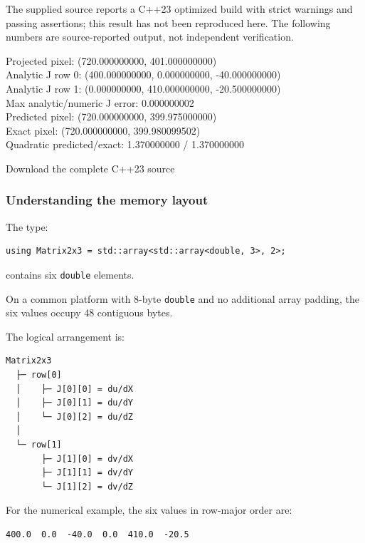The supplied source reports a C++23 optimized build with strict warnings and passing assertions; this result has not been reproduced here. The following numbers are source-reported output, not independent verification.

Projected pixel: (720.000000000, 401.000000000)\\
Analytic J row 0: (400.000000000, 0.000000000, -40.000000000)\\
Analytic J row 1: (0.000000000, 410.000000000, -20.500000000)\\
Max analytic/numeric J error: 0.000000002\\
Predicted pixel: (720.000000000, 399.975000000)\\
Exact pixel: (720.000000000, 399.980099502)\\
Quadratic predicted/exact: 1.370000000 / 1.370000000

Download the complete C++23 source

\subsubsection{Understanding the memory layout}\label{02-foundations-ii-ch021-understanding-the-memory-layout}

\hypertarget{02-foundations-ii-ch021-understanding-the-memory-layout}{}

The type:

\begin{verbatim}
using Matrix2x3 = std::array<std::array<double, 3>, 2>;
\end{verbatim}

contains six \texttt{double} elements.

On a common platform with 8-byte \texttt{double} and no additional array padding, the six values occupy 48 contiguous bytes.

The logical arrangement is:

\begin{verbatim}
Matrix2x3
  ├─ row[0]
  │    ├─ J[0][0] = du/dX
  │    ├─ J[0][1] = du/dY
  │    └─ J[0][2] = du/dZ
  │
  └─ row[1]
       ├─ J[1][0] = dv/dX
       ├─ J[1][1] = dv/dY
       └─ J[1][2] = dv/dZ
\end{verbatim}

For the numerical example, the six values in row-major order are:

\begin{verbatim}
400.0  0.0  -40.0  0.0  410.0  -20.5
\end{verbatim}

